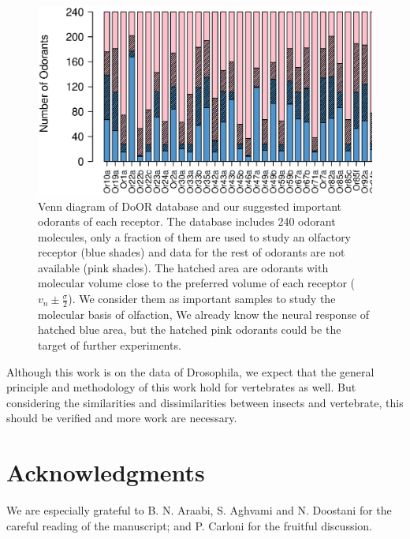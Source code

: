 \documentclass[11pt]{paper} %
\begin{document}
\begin{figure}
	\includegraphics[width=\textwidth]{fig/odorant-suggest}
	\caption{Venn diagram of DoOR database and our suggested important odorants of each receptor.
			The database includes 240 odorant molecules, 
			only a fraction of them are used to study an olfactory receptor (blue shades)
			and data for the rest of odorants are not available (pink shades).
			The hatched area are odorants with molecular volume close to the preferred volume of each receptor
			($v_n \pm \frac{\sigma}{2}$).
			We consider them as important samples to study the molecular basis of olfaction,
			We already know the neural response of hatched blue area, 
			but the hatched pink odorants could be the target of further experiments.}
	\label{fig:odorant-suggest}
\end{figure}


Although this work is on the data of Drosophila, 
we expect that the general principle and methodology of this work hold for vertebrates as well. 
But considering the similarities and dissimilarities between insects and vertebrate, 
this should be verified and more work are necessary.

\section{Acknowledgments}
We are especially grateful to B. N. Araabi, S. Aghvami and N. Doostani for the careful reading of the manuscript; and P. Carloni for the fruitful discussion.

\printbibliography
\end{document}
